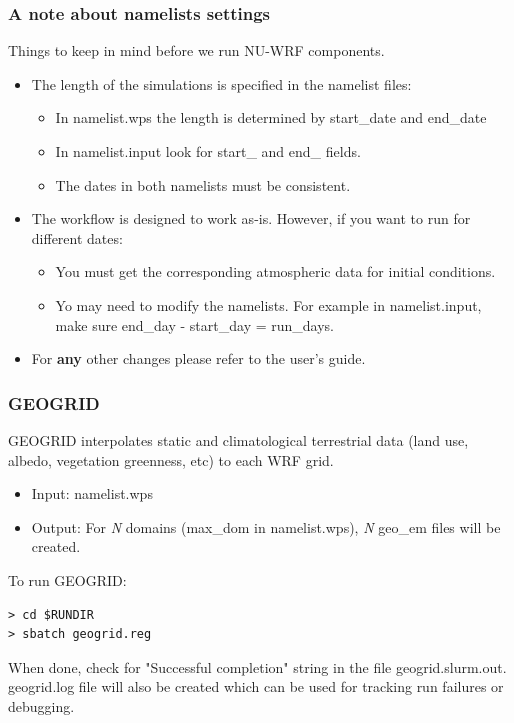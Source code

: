 \begin{frame}[fragile]\frametitle{A note about namelists settings}

Things to keep in mind before we run NU-WRF components.
\mbox{}\\
\begin{itemize}
\item The length of the simulations is specified in the namelist files:
\begin{itemize}
\item In namelist.wps the length is determined by start\_date and end\_date
\item In namelist.input look for start\_ and end\_ fields. 
\item The dates in both namelists must be consistent.
\end{itemize}
\item The workflow is designed to work as-is. However, if you want to run for different dates:
\begin{itemize}
\item You must get the corresponding atmospheric data for initial conditions. 
\item Yo may need to modify the namelists. For example in namelist.input, make sure end\_day - start\_day = run\_days.
\end{itemize}
\item For \textbf{any} other changes please refer to the user's guide.
\end{itemize}
\end{frame}

\begin{frame}[fragile]\frametitle{GEOGRID}

\scriptsize{
GEOGRID interpolates static and climatological terrestrial data (land use, albedo, vegetation greenness, etc) to each WRF grid.
\begin{itemize}
\item Input: namelist.wps
\item Output: For \emph{N} domains (max\_dom in namelist.wps), \emph{N} geo\_em files will be created.
\end{itemize}\scriptsize}    
\hrulefill\par
To run GEOGRID:
\verbatimfont{\scriptsize}%
\begin{verbatim}
> cd $RUNDIR
> sbatch geogrid.reg
\end{verbatim}
When done, check for  "Successful completion"  string in the file geogrid.slurm.out.
geogrid.log file will also be created which can be used for tracking run failures or debugging.


\end{frame}

